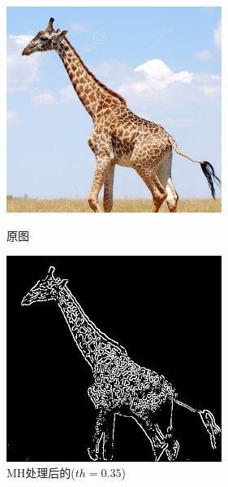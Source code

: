 \documentclass[11pt, a4paper, UTF8]{ctexart}
\begin{document}
\begin{figure}[H]
  \centering
  \begin{minipage}[t]{0.48\textwidth}
  \centering
  \includegraphics[width=7cm]{giraffe.jpg}
  \caption{原图}
  \end{minipage}
  \begin{minipage}[t]{0.48\textwidth}
  \centering
  \includegraphics[width=7cm]{MH_alpha=0.35_giraffe.png}
  \caption{MH处理后的($th=0.35$)}
  \end{minipage}
\end{figure}
\end{document}
